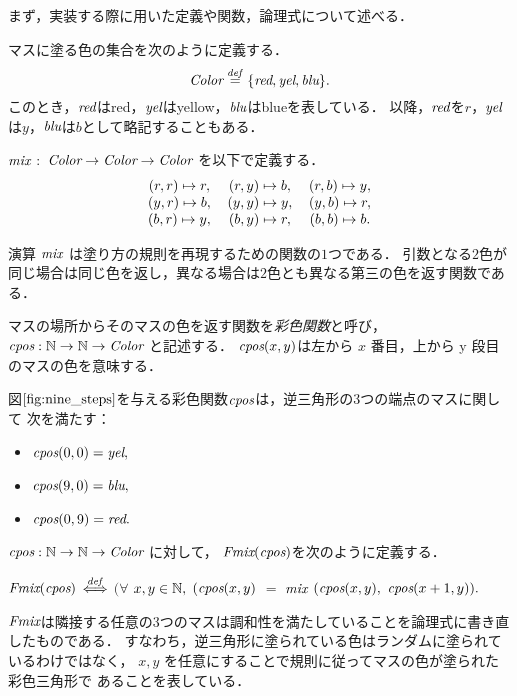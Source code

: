 まず，実装する際に用いた定義や関数，論理式について述べる．
\begin{dfn}[$\Color$]\rm
  マスに塗る色の集合を次のように定義する．
  \[
  \textit{Color} \overset{{\it def}}{=} \{\textit{red}, \textit{yel}, \textit{blu}\}.
  \]
  このとき，$\textit{red}$は{\rm{red}}，$\textit{yel}$は{\rm{yellow}}，$\textit{blu}$は{\rm{blue}}を表している．
  以降，$\textit{red}$を$r$，$\textit{yel}$は$y$，$\textit{blu}$は$b$として略記することもある．
\end{dfn}
\begin{dfn}[$\mix$]\rm
  $\mix$ $:$ $\textit{Color} \to \textit{Color} \to \textit{Color}$ を以下で定義する．
  \[
  \begin{tabular}{ccccc}
    $(r,r) \Pto r,$ & $(r,y) \Pto b,$ & $(r,b) \Pto y,$ \\
    $(y,r) \Pto b,$ & $(y,y) \Pto y,$ & $(y,b) \Pto r,$ \\
    $(b,r) \Pto y,$ & $(b,y) \Pto r,$ & $(b,b) \Pto b.$ \\
  \end{tabular}
  \]
\end{dfn}
演算 $\mix$ は塗り方の規則を再現するための関数の$1$つである．
引数となる$2$色が同じ場合は同じ色を返し，異なる場合は$2$色とも異なる第三の色を返す関数である．
\begin{dfn}[彩色関数]\rm
  マスの場所からそのマスの色を返す関数を{\em 彩色関数}と呼び，
  $\textit{cpos} : \mathbb{N} \to \mathbb{N} \to \textit{Color}$ と記述する．
  $\textit{cpos}(x,y)$は左から $x$ 番目，上から y 段目のマスの色を意味する．
\end{dfn}
\begin{exm}
  図$\ref{fig:nine_steps}$を与える彩色関数$\textit{cpos}$は，逆三角形の$3$つの端点のマスに関して
  次を満たす：
  \begin{itemize}
    \item $\textit{cpos}(0,0) = \textit{yel},$
    \item $\textit{cpos}(9,0) = \textit{blu},$
    \item $\textit{cpos}(0,9) = \textit{red}.$
  \end{itemize}
\end{exm}
\begin{dfn}[$\Fmix$]\rm
  $\textit{cpos} : \mathbb{N} \to \mathbb{N} \to \textit{Color}$ に対して，
  $\textit{Fmix}(\textit{cpos})$を次のように定義する．

  $\textit{Fmix}(\textit{cpos})$ $\overset{{\it def}}{\Longleftrightarrow}$
  $(\forall$ $x,y \in\mathbb{N},$
  $(\textit{cpos}(x,y)$ $=$ $\mix$ $(\textit{cpos}(x,y),$ $\textit{cpos}(x+1,y)).$
\end{dfn}
$\Fmix$は隣接する任意の$3$つのマスは調和性を満たしていることを論理式に書き直したものである．
すなわち，逆三角形に塗られている色はランダムに塗られているわけではなく，
$x,y$ を任意にすることで規則に従ってマスの色が塗られた彩色三角形で
あることを表している．

